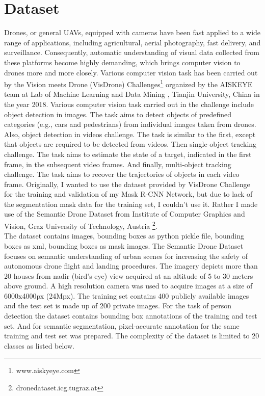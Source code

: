 \section{Dataset}
Drones, or general UAVs, equipped with cameras have been fast applied to a wide range of applications, including agricultural, aerial photography, fast delivery, and surveillance. Consequently, automatic understanding of visual data collected from these platforms become highly demanding, which brings computer vision to drones more and more closely. 
Various computer vision task has been carried out by the Vision meets Drone (VisDrone) Challenges\footnote{www.aiskyeye.com}
organized  by the AISKEYE team at Lab of Machine Learning and Data Mining , Tianjin University, China in the year 2018.
Various computer vision task carried out in the challenge include object detection in images. The task aims to detect objects of predefined categories (e.g., cars and pedestrians) from individual images taken from drones. Also, object detection in videos challenge. The task is similar to the first, except that objects are required to be detected from videos. Then single-object tracking challenge. The task aims to estimate the state of a target, indicated in the first frame, in the subsequent video frames. And finally, multi-object tracking challenge. The task aims to recover the trajectories of objects in each video frame.
Originally, I wanted to use the dataset provided by VisDrone Challenge for the training and validation of my Mask R-CNN Network, but due to lack of the segmentation mask data for the training set, I couldn’t use it.
Rather I made use of the Semantic Drone Dataset from Institute of Computer Graphics and Vision, Graz University of Technology, Austria \footnote{dronedataset.icg.tugraz.at}.
\\
The dataset contains images, bounding boxes as python pickle file, bounding boxes as xml, bounding boxes as mask images. The Semantic Drone Dataset focuses on semantic understanding of urban scenes for increasing the safety of autonomous drone flight and landing procedures. The imagery depicts  more than 20 houses from nadir (bird's eye) view acquired at an altitude of 5 to 30 meters above ground. A high resolution camera was used to acquire images at a size of 6000x4000px (24Mpx). The training set contains 400 publicly available images and the test set is made up of 200 private images. \protect\cite{W}
For the task of person detection the dataset contains bounding box annotations of the training and test set. And for semantic segmentation, pixel-accurate annotation for the same training and test set was prepared. The complexity of the dataset is limited to 20 classes as listed below.

